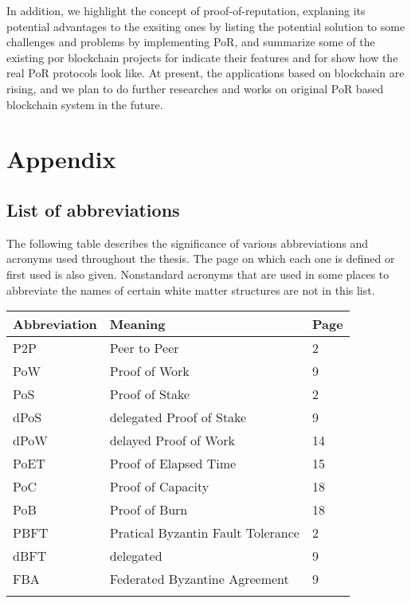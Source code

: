 \documentclass[doublespacing]{bmcart}
\begin{document}
\begin{CJK*}{UTF8}{gbsn}
	In addition, we highlight the concept of proof-of-reputation, explaning its potential advantages to the exsiting ones by listing the potential solution to some challenges and problems by implementing PoR, and summarize some of the existing por blockchain projects for indicate their features and for show how the real PoR protocols look like. At present, the applications based on blockchain are rising, and we plan to do further researches and works on original PoR based blockchain system in the future.
	
\section*{Appendix}
\subsection*{List of abbreviations}
The following table describes the significance of various abbreviations and acronyms used throughout the thesis. The page on which each one is defined or first used is also given. Nonstandard acronyms that are used in some places to abbreviate the names of certain white matter structures are not in this list.

\begin{tabular}{lll}
\hline
Abbreviation & Meaning  & Page  \\ \hline
P2P & Peer to Peer & 2 \\ 
PoW & Proof of Work & 9 \\ 
PoS & Proof of Stake & 2 \\ 
dPoS & delegated Proof of Stake & 9 \\ 
dPoW & delayed Proof of Work & 14 \\ 
PoET & Proof of Elapsed Time  & 15 \\ 
PoC & Proof of Capacity & 18 \\ 
PoB & Proof of Burn & 18 \\ 
PBFT & Pratical Byzantin Fault Tolerance & 2 \\ 
dBFT & delegated  & 9 \\ 
FBA & Federated Byzantine Agreement & 9 \\ 
 &  &  \\  
\end{tabular}


\end{CJK*}
\end{document}

